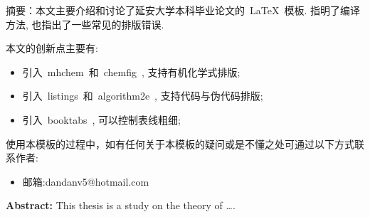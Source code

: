 \begin{cnabstract}
{\heiti 摘要：}本文主要介绍和讨论了延安大学本科毕业论文的~\LaTeX~模板.
指明了编译方法, 也指出了一些常见的排版错误. 

本文的创新点主要有:
\begin{itemize}
	\item 引入~mhchem~和~chemfig~, 支持有机化学式排版; 
	\item 引入~listings~和~algorithm2e~, 支持代码与伪代码排版; 
	\item 引入~booktabs~, 可以控制表线粗细;
\end{itemize}

使用本模板的过程中，如有任何关于本模板的疑问或是不懂之处可通过以下方式联系作者:

\begin{itemize}
	\item 邮箱:dandanv5@hotmail.com
\end{itemize}

\end{cnabstract}
\par
\vspace*{2em}






\begin{enabstract}
	\textbf{Abstract: }This thesis is a study on the theory of \dots.

\end{enabstract}
\par
\vspace*{2em}

 \enkeywords{\LaTeX{}}
